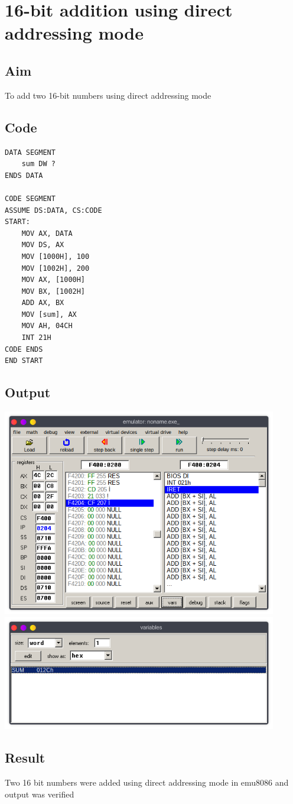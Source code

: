 \section{16-bit addition using direct addressing mode}
\subsection{Aim}
To add two 16-bit numbers using direct addressing mode

\subsection{Code}
\begin{lstlisting}
DATA SEGMENT
    sum DW ?
ENDS DATA

CODE SEGMENT
ASSUME DS:DATA, CS:CODE
START:
    MOV AX, DATA
    MOV DS, AX
    MOV [1000H], 100
    MOV [1002H], 200
    MOV AX, [1000H]
    MOV BX, [1002H]
    ADD AX, BX
    MOV [sum], AX
    MOV AH, 04CH
    INT 21H
CODE ENDS
END START
\end{lstlisting}

\subsection{Output}
\begin{center}
	\includegraphics[width=0.90\textwidth]{img/p1/ss1.png}
	\includegraphics[width=0.90\textwidth]{img/p1/ss2.png}
\end{center}

\subsection{Result}
Two 16 bit numbers were added using direct addressing mode in emu8086 and output was verified